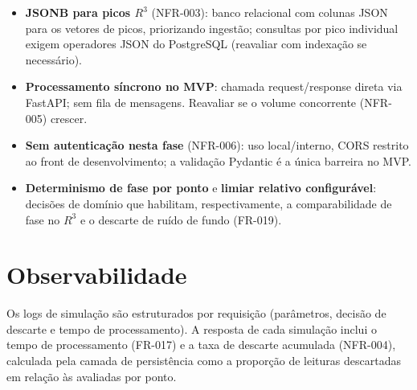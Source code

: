 \begin{itemize}
  \item \textbf{JSONB para picos \(R^3\)} (NFR-003): banco relacional com colunas
  JSON para os vetores de picos, priorizando ingestão; consultas por pico
  individual exigem operadores JSON do PostgreSQL (reavaliar com indexação se
  necessário).
  \item \textbf{Processamento síncrono no MVP}: chamada request/response direta
  via FastAPI; sem fila de mensagens. Reavaliar se o volume concorrente (NFR-005)
  crescer.
  \item \textbf{Sem autenticação nesta fase} (NFR-006): uso local/interno, CORS
  restrito ao front de desenvolvimento; a validação Pydantic é a única barreira
  no MVP.
  \item \textbf{Determinismo de fase por ponto} e \textbf{limiar relativo
  configurável}: decisões de domínio que habilitam, respectivamente, a
  comparabilidade de fase no \(R^3\) e o descarte de ruído de fundo (FR-019).
\end{itemize}

\section{Observabilidade}

Os logs de simulação são estruturados por requisição (parâmetros, decisão de
descarte e tempo de processamento). A resposta de cada simulação inclui o tempo
de processamento (FR-017) e a taxa de descarte acumulada (NFR-004), calculada
pela camada de persistência como a proporção de leituras descartadas em relação
às avaliadas por ponto.
